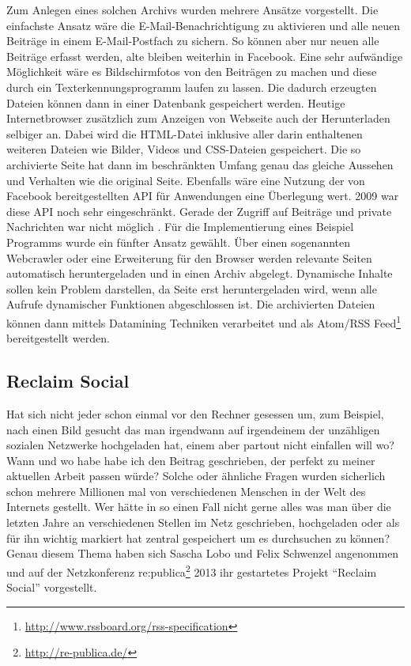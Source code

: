 Zum Anlegen eines solchen Archivs wurden mehrere Ansätze vorgestellt. Die einfachste Ansatz wäre die E-Mail-Benachrichtigung zu aktivieren und alle neuen Beiträge in einem E-Mail-Postfach zu sichern. So können aber nur neuen alle Beiträge erfasst werden, alte bleiben weiterhin in Facebook. Eine sehr aufwändige Möglichkeit wäre es Bildschirmfotos von den Beiträgen zu machen und diese durch ein Texterkennungsprogramm laufen zu lassen. Die dadurch erzeugten Dateien können dann in einer Datenbank gespeichert werden. Heutige Internetbrowser zusätzlich zum Anzeigen von Webseite auch der Herunterladen selbiger an. Dabei wird die HTML-Datei inklusive aller darin enthaltenen weiteren Dateien wie Bilder, Videos und CSS-Dateien gespeichert. Die so archivierte Seite hat dann im beschränkten Umfang genau das gleiche Aussehen und Verhalten wie die original Seite. Ebenfalls wäre eine Nutzung der von Facebook bereitgestellten API für Anwendungen eine Überlegung wert. 2009 war diese API noch sehr eingeschränkt. Gerade der Zugriff auf Beiträge und private Nachrichten war nicht möglich \cite[S.\,253, Table 1]{McCown2009}. Für die Implementierung eines Beispiel Programms wurde ein fünfter Ansatz gewählt. Über einen sogenannten Webcrawler oder eine Erweiterung für den Browser werden relevante Seiten automatisch heruntergeladen und in einen Archiv abgelegt. Dynamische Inhalte sollen kein Problem darstellen, da Seite erst heruntergeladen wird, wenn alle Aufrufe dynamischer Funktionen abgeschlossen ist. Die archivierten Dateien können dann mittels Datamining Techniken verarbeitet und als Atom/RSS Feed\footnote{\url{http://www.rssboard.org/rss-specification}} bereitgestellt werden. 


\subsection{Reclaim Social} %
\label{sub:reclaim_social}

Hat sich nicht jeder schon einmal vor den Rechner gesessen um, zum Beispiel, nach einen Bild gesucht das man irgendwann auf irgendeinem der unzähligen sozialen Netzwerke hochgeladen hat, einem aber partout nicht einfallen will wo? Wann und wo habe habe ich den Beitrag geschrieben, der perfekt zu meiner aktuellen Arbeit passen würde? Solche oder ähnliche Fragen wurden sicherlich schon mehrere Millionen mal von verschiedenen Menschen in der Welt des Internets gestellt. Wer hätte in so einen Fall nicht gerne alles was man über die letzten Jahre an verschiedenen Stellen im Netz geschrieben, hochgeladen oder als für ihn wichtig markiert hat zentral gespeichert um es durchsuchen zu können? Genau diesem Thema haben sich Sascha Lobo und Felix Schwenzel angenommen und auf der Netzkonferenz re:publica\footnote{\url{http://re-publica.de/}} 2013 ihr gestartetes Projekt \enquote{Reclaim Social} \cite{Schwenzel2013} vorgestellt.

